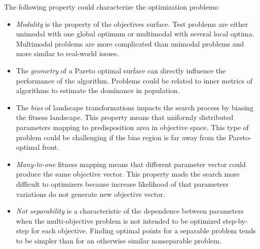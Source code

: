     The following property \cite{WFGref} could characterize the optimization problems:
    \begin{itemize}
        \item \emph{Modality} is the property of the objectives surface. Test problems are either unimodal with one global optimum or multimodal with several local optima. Multimodal problems are more complicated than unimodal problems and more similar to real-world issues.
        \item The \emph{geometry} of a Pareto optimal surface can directly influence the performance of the algorithm. Problems could be related to inner metrics of algorithms to estimate the dominance in population.
        \item The \emph{bias} of landscape transformations impacts the search process by biasing the fitness landscape. This property means that uniformly distributed parameters mapping to predisposition area in objective space. This type of problem could be challenging if the bias region is far away from the Pareto-optimal front.
        \item \emph{Many-to-one} fitness mapping means that different parameter vector could produce the same objective vector. This property made the search more difficult to optimizers because increase likelihood of that parameters variations do not generate new objective vector.
        \item \emph{Not separability }is a characteristic of the dependence between parameters when the multi-objective problem is not intended to be optimized step-by-step for each objective. Finding optimal points for a separable problem tends to be simpler than for an otherwise similar nonseparable problem.
    \end{itemize}

